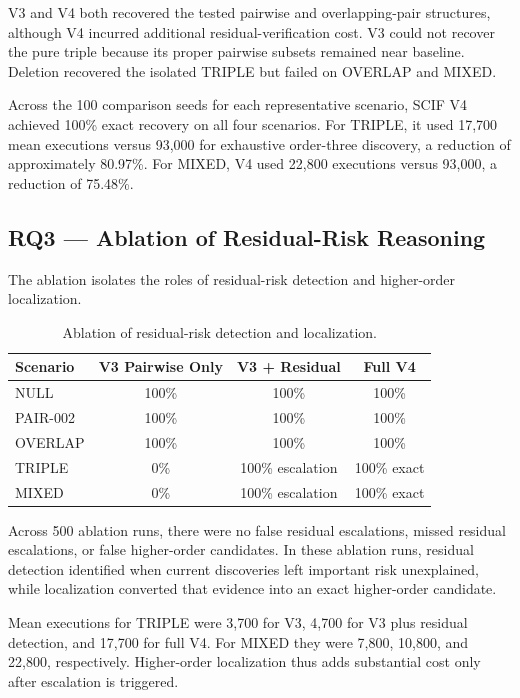 V3 and V4 both recovered the tested pairwise and overlapping-pair structures, although V4 incurred additional residual-verification cost. V3 could not recover the pure triple because its proper pairwise subsets remained near baseline. Deletion recovered the isolated TRIPLE but failed on OVERLAP and MIXED.

Across the 100 comparison seeds for each representative scenario, SCIF V4 achieved 100\% exact recovery on all four scenarios. For TRIPLE, it used 17,700 mean executions versus 93,000 for exhaustive order-three discovery, a reduction of approximately 80.97\%. For MIXED, V4 used 22,800 executions versus 93,000, a reduction of 75.48\%.

\subsection{RQ3 --- Ablation of Residual-Risk Reasoning}

The ablation isolates the roles of residual-risk detection and higher-order localization.

\begin{table}[t]
\caption{Ablation of residual-risk detection and localization.}
\label{tab:ablation}
\centering
\footnotesize
\setlength{\tabcolsep}{8pt}
\begin{tabular}{lccc}
\toprule
Scenario & V3 Pairwise Only & V3 + Residual & Full V4 \\
\midrule
NULL     & 100\% & 100\% & 100\% \\
PAIR-002 & 100\% & 100\% & 100\% \\
OVERLAP  & 100\% & 100\% & 100\% \\
TRIPLE   & 0\% & 100\% escalation & 100\% exact \\
MIXED    & 0\% & 100\% escalation & 100\% exact \\
\bottomrule
\end{tabular}
\end{table}

Across 500 ablation runs, there were no false residual escalations, missed residual escalations, or false higher-order candidates. In these ablation runs, residual detection identified when current discoveries left important risk unexplained, while localization converted that evidence into an exact higher-order candidate.

Mean executions for TRIPLE were 3,700 for V3, 4,700 for V3 plus residual detection, and 17,700 for full V4. For MIXED they were 7,800, 10,800, and 22,800, respectively. Higher-order localization thus adds substantial cost only after escalation is triggered.

